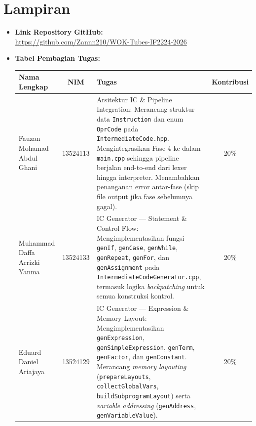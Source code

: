 \documentclass[12pt, a4paper]{article}
\begin{document}
\section{Lampiran}
\begin{itemize}
    \item \textbf{Link Repository GitHub:} \\
    \url{https://github.com/Zannn210/WOK-Tubes-IF2224-2026}
    
    \vspace{0.2cm}
    \item \textbf{Tabel Pembagian Tugas:}
\begin{table}[H]
    \centering
    \renewcommand{\arraystretch}{1.5}
    \setlength{\tabcolsep}{6pt}
    \begin{tabular}{|p{}|c|p{}|c|}
        \hline
        \textbf{Nama Lengkap} & \textbf{NIM} & \textbf{Tugas} & \textbf{Kontribusi} \\
        \hline
        
        Fauzan Mohamad Abdul Ghani & 13524113 & 
        Arsitektur IC \& Pipeline Integration: Merancang struktur data \texttt{Instruction} dan enum \texttt{OprCode} pada \texttt{IntermediateCode.hpp}. Mengintegrasikan Fase 4 ke dalam \texttt{main.cpp} sehingga pipeline berjalan end-to-end dari lexer hingga interpreter. Menambahkan penanganan error antar-fase (skip file output jika fase sebelumnya gagal).
        & 20\% \\
        \hline
        
        Muhammad Daffa Arrizki Yanma & 13524133 & 
        IC Generator --- Statement \& Control Flow: Mengimplementasikan fungsi \texttt{genIf}, \texttt{genCase}, \texttt{genWhile}, \texttt{genRepeat}, \texttt{genFor}, dan \texttt{genAssignment} pada \texttt{IntermediateCodeGenerator.cpp}, termasuk logika \textit{backpatching} untuk semua konstruksi kontrol.
        & 20\% \\
        \hline
        
        Eduard Daniel Ariajaya & 13524129 & 
        IC Generator --- Expression \& Memory Layout: Mengimplementasikan \texttt{genExpression}, \texttt{genSimpleExpression}, \texttt{genTerm}, \texttt{genFactor}, dan \texttt{genConstant}. Merancang \textit{memory layouting} (\texttt{prepareLayouts}, \texttt{collectGlobalVars}, \texttt{buildSubprogramLayout}) serta \textit{variable addressing} (\texttt{genAddress}, \texttt{genVariableValue}).
        & 20\% \\
        \hline
        

\end{tabular}
\end{table}
\end{itemize}
\end{document}
